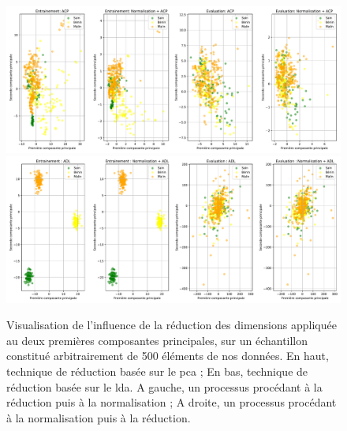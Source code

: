 \begin{figure}[H]
    \centering
    \includegraphics[width=\linewidth]{contents/chapter_4/resources/visualisation_scaling_PCA.pdf}
    \includegraphics[width=\linewidth]{contents/chapter_4/resources/visualisation_scaling_LDA.pdf}
    \caption{Visualisation de l'influence de la réduction des dimensions appliquée au deux premières composantes principales, sur un échantillon constitué arbitrairement de 500 éléments de nos données. En haut, technique de réduction basée sur le \gls{pca} ; En bas, technique de réduction basée sur le \gls{lda}. A gauche, un processus procédant à la réduction puis à la normalisation ; A droite, un processus procédant à la normalisation puis à la réduction.}
    \label{fig:visualisation_scaling_reduction}
\end{figure}\par

\clearpage


